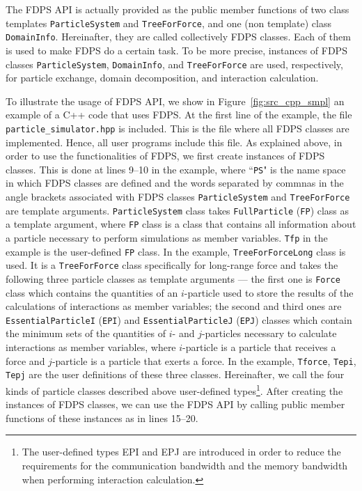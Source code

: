 \documentclass[proof,useamsfonts]{pasj01}
\begin{document}
The FDPS API is actually provided as the public member functions of two class templates \texttt{ParticleSystem} and \texttt{TreeForForce}, and one (non template) class \texttt{DomainInfo}. Hereinafter, they are called collectively FDPS classes. Each of them is used to make FDPS do a certain task. To be more precise, instances of FDPS classes \texttt{ParticleSystem}, \texttt{DomainInfo}, and \texttt{TreeForForce} are used, respectively, for particle exchange, domain decomposition, and interaction calculation.

To illustrate the usage of FDPS API, we show in Figure~\ref{fig:src_cpp_smpl} an example of a C++ code that uses FDPS. At the first line of the example, the file \texttt{particle\_simulator.hpp} is included. This is the file where all FDPS classes are implemented. Hence, all user programs include this file. As explained above, in order to use the functionalities of FDPS, we first create instances of FDPS classes. This is done at lines 9--10 in the example, where ``\texttt{PS}" is the name space in which FDPS classes are defined and the words separated by commnas in the angle brackets associated with FDPS classes \texttt{ParticleSystem} and \texttt{TreeForForce} are template arguments. \texttt{ParticleSystem} class takes \texttt{FullParticle} (\texttt{FP}) class as a template argument, where \texttt{FP} class is a class that contains all information about a particle necessary to perform simulations as member variables. \texttt{Tfp} in the example is the user-defined \texttt{FP} class. In the example, \texttt{TreeForForceLong} class is used. It is a \texttt{TreeForForce} class specifically for long-range force and takes the following three particle classes as template arguments --- the first one is \texttt{Force} class which  contains the quantities of an $i$-particle used to store the results of the calculations of interactions as member variables; the second and third ones are \texttt{EssentialParticleI} (\texttt{EPI}) and \texttt{EssentialParticleJ} (\texttt{EPJ}) classes which contain the minimum sets of the quantities of $i$- and $j$-particles necessary to calculate interactions as member variables, where $i$-particle is a particle that receives a force and $j$-particle is a particle that exerts a force. In the example, \texttt{Tforce}, \texttt{Tepi}, \texttt{Tepj} are the user definitions of these three classes. Hereinafter, we call the four kinds of particle classes described above user-defined types\footnote{The user-defined types EPI and EPJ are introduced in order to reduce the requirements for the communication bandwidth and the memory bandwidth when performing interaction calculation.}. After creating the instances of FDPS classes, we can use the FDPS API by calling public member functions of these instances as in lines 15--20. 
\end{document}
